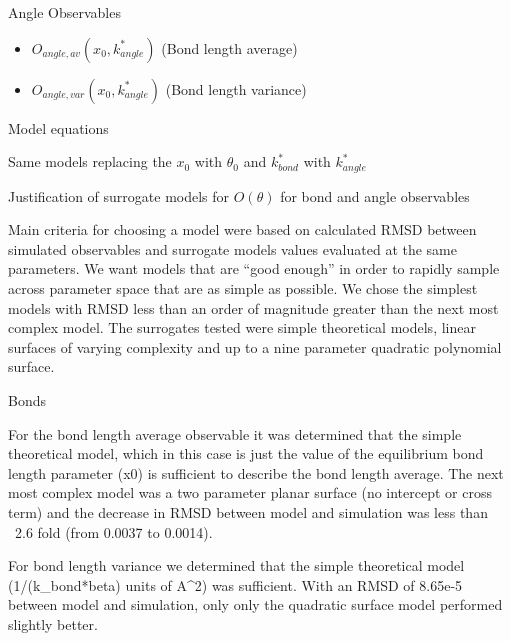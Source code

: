 \documentclass{report}
\begin{document}
\begin{outline}
\begin{outline}
\begin{outline}
\begin{outline}
\begin{outline}
\begin{outline}
\begin{outline}
           \item{Angle Observables}
            \begin{itemize}
            \item $O_{angle, av}(x_0,k_{angle}^*)$ (Bond length average)
            \item $O_{angle, var}(x_0,k_{angle}^*)$ (Bond length variance)
            \end{itemize}
           \item{Model equations}
           \begin{outline}
            \item{Same models replacing the $x_0$ with $\theta_0$ and $k_{bond}^*$ with $k_{angle}^*$}
           \end{outline}
          \end{outline}
          \item{Justification of surrogate models for $O(\theta)$ for bond and angle observables}
          \begin{outline}
           \item{Main criteria for choosing a model were based on calculated RMSD between simulated observables and surrogate models 
                 values evaluated at the same parameters. We want models that are “good enough” in order to rapidly sample across 
                 parameter space that are as simple as possible. We chose the simplest models with RMSD less than an order of magnitude 
                 greater than the next most complex model. The surrogates tested were simple theoretical models, linear surfaces of 
                 varying complexity and up to a nine parameter quadratic polynomial surface.}
           \item{Bonds}
           \begin{outline}
            \item{For the bond length average observable it was determined that the simple theoretical model, which in this case is just 
                  the value of the equilibrium bond length parameter (x0) is sufficient to describe the bond length average. The next most 
                  complex model was a two parameter planar surface (no intercept or cross term) and the decrease in RMSD between model and 
                  simulation was less than ~2.6 fold (from 0.0037 to 0.0014).
            \item{For bond length variance we determined that the simple theoretical model (1/(k_bond*beta) units of A^2) was sufficient. 
                  With an RMSD of 8.65e-5 between model and simulation, only only the quadratic surface model performed slightly better.}
}
\end{outline}
\end{outline}
\end{outline}
\end{outline}
\end{outline}
\end{outline}
\end{outline}
\end{outline}
\end{document}
